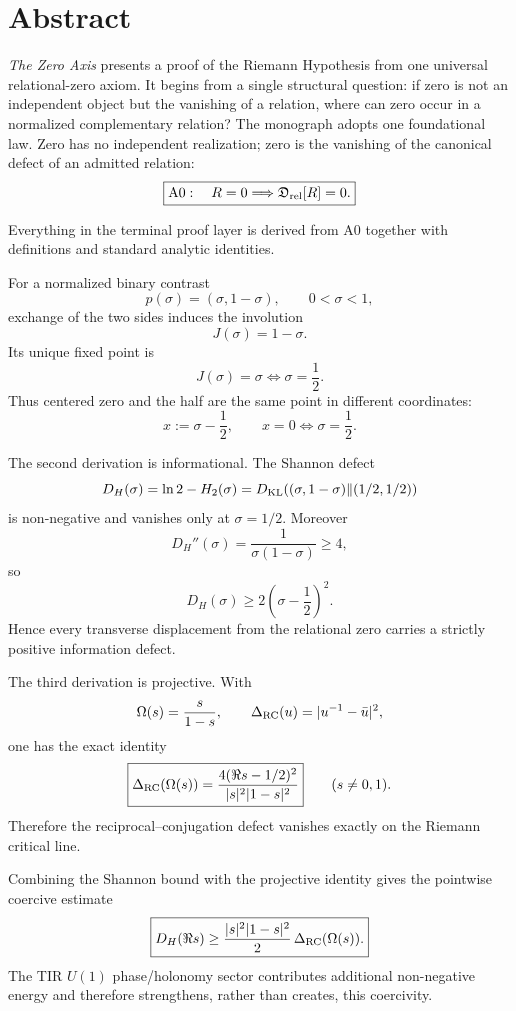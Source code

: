 \chapter*{Abstract}

\emph{The Zero Axis} presents a proof of the Riemann Hypothesis from one universal relational-zero axiom. It begins from a single structural question: if zero is not an
independent object but the vanishing of a relation, where can zero occur in a
normalized complementary relation?  The monograph adopts one foundational law.
Zero has no independent realization; zero is the vanishing of the canonical
defect of an admitted relation:
\[
\boxed{
\mathrm{A0}:\quad
R=0\Longrightarrow\mathfrak D_{\rm rel}[R]=0.
}
\]

Everything in the terminal proof layer is derived from A0 together with
definitions and standard analytic identities.

For a normalized binary contrast
\[
p(\sigma)=(\sigma,1-\sigma),\qquad 0<\sigma<1,
\]
exchange of the two sides induces the involution
\[
J(\sigma)=1-\sigma.
\]
Its unique fixed point is
\[
J(\sigma)=\sigma
\iff
\sigma=\frac12.
\]
Thus centered zero and the half are the same point in different coordinates:
\[
x:=\sigma-\frac12,\qquad
x=0\iff \sigma=\frac12.
\]

The second derivation is informational.  The Shannon defect
\[
D_H(\sigma)
=
\ln2-H_2(\sigma)
=
D_{\rm KL}\!\left(
(\sigma,1-\sigma)
\middle\|
(1/2,1/2)
\right)
\]
is non-negative and vanishes only at \(\sigma=1/2\).  Moreover
\[
D_H''(\sigma)=\frac1{\sigma(1-\sigma)}\ge4,
\]
so
\[
D_H(\sigma)\ge2\left(\sigma-\frac12\right)^2.
\]
Hence every transverse displacement from the relational zero carries a
strictly positive information defect.

The third derivation is projective.  With
\[
\Omega(s)=\frac{s}{1-s},
\qquad
\Delta_{\rm RC}(u)=|u^{-1}-\bar u|^2,
\]
one has the exact identity
\[
\boxed{
\Delta_{\rm RC}(\Omega(s))
=
\frac{4(\Re s-1/2)^2}{|s|^2|1-s|^2}
}
\qquad(s\ne0,1).
\]
Therefore the reciprocal--conjugation defect vanishes exactly on the Riemann
critical line.

Combining the Shannon bound with the projective identity gives the pointwise
coercive estimate
\[
\boxed{
D_H(\Re s)
\ge
\frac{|s|^2|1-s|^2}{2}\,
\Delta_{\rm RC}(\Omega(s)).
}
\]
The TIR \(U(1)\) phase/holonomy sector contributes additional non-negative
energy and therefore strengthens, rather than creates, this coercivity.


